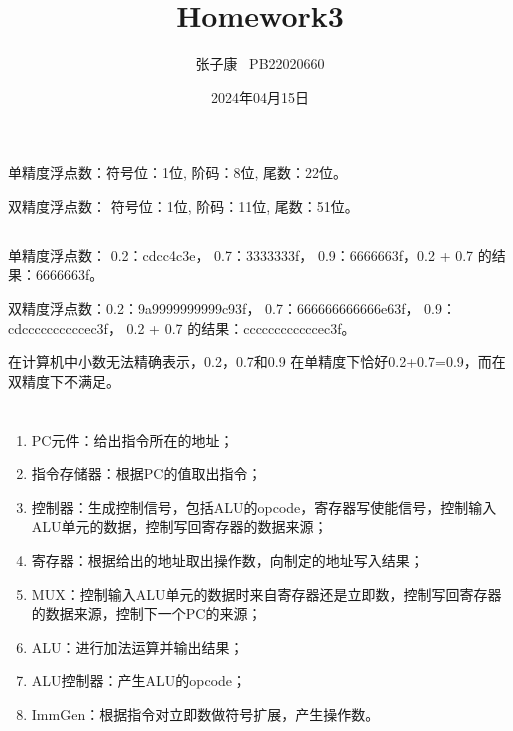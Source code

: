 \documentclass[12pt,a4paper]{ctexart}
\title{Homework3}
\author{张子康 \ PB22020660}
\date{2024年04月15日}
\begin{document}
\maketitle
\newpage
\section{}
\subsection{}
单精度浮点数：符号位：1位,
阶码：8位,
尾数：22位。\par
双精度浮点数：
符号位：1位,
阶码：11位,
尾数：51位。
\subsection{}
单精度浮点数：
0.2：cdcc4c3e，
0.7：3333333f，
0.9：6666663f，0.2 + 0.7 的结果：6666663f。\par
双精度浮点数：0.2：9a9999999999c93f，
0.7：666666666666e63f，
0.9：cdccccccccccec3f，
0.2 + 0.7 的结果：ccccccccccccec3f。\par
在计算机中小数无法精确表示，0.2，0.7和0.9
在单精度下恰好0.2+0.7=0.9，而在双精度下不满足。

\section{}
\subsection{}
\subsubsection{}
\begin{enumerate}
    \item PC元件：给出指令所在的地址；
    \item 指令存储器：根据PC的值取出指令；
    \item 控制器：生成控制信号，包括ALU的opcode，寄存器写使能信号，控制输入ALU单元的数据，控制写回寄存器的数据来源；
    \item 寄存器：根据给出的地址取出操作数，向制定的地址写入结果；
    \item MUX：控制输入ALU单元的数据时来自寄存器还是立即数，控制写回寄存器的数据来源，控制下一个PC的来源；
    \item ALU：进行加法运算并输出结果；
    \item ALU控制器：产生ALU的opcode；
    \item ImmGen：根据指令对立即数做符号扩展，产生操作数。
\end{enumerate}
\end{document}
